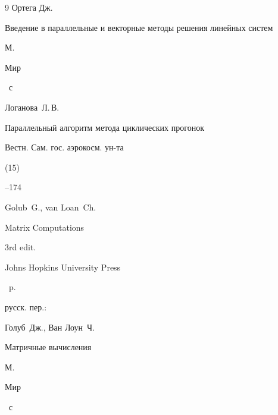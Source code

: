 \begin{thebibliography}{9}
\by Ортега Дж.

\book Введение в параллельные и векторные методы решения линейных систем

\publaddr М.

\publ Мир


~с



\Russian



\newpage








\by Логанова~Л.\,В.

\paper Параллельный алгоритм метода циклических прогонок

\jour Вестн. Сам. гос. аэрокосм. ун-та 


(15)

--174




\by Golub~G., van Loan~Ch.


\book Matrix Computations

\bookinfo  3rd edit.

\publ Johns Hopkins University Press

~p.

\rtransl

русск. пер.:

\by Голуб~Дж., Ван Лоун~Ч.

\book Матричные вычисления 

\publaddr М.

\publ Мир


~с



\end{thebibliography}









\makeengtitlem




%




% 